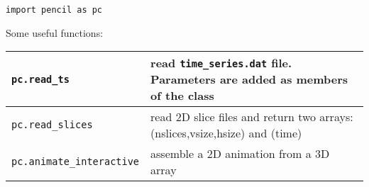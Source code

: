 \documentclass[a4paper,12pt]{article}
\begin{document}
\begin{verbatim}
import pencil as pc
\end{verbatim}

Some useful functions:
\begin{center}
\begin{tabular}{|l|l|}\hline
\verb|pc.read_ts| & read \verb|time_series.dat| file. Parameters are added as members of the class\\\hline
\verb|pc.read_slices| & read 2D slice files and return two arrays: (nslices,vsize,hsize) and (time)\\\hline
\verb|pc.animate_interactive| & assemble a 2D animation from a 3D array\\\hline
\end{tabular}
\end{center}


% 
\end{document}
